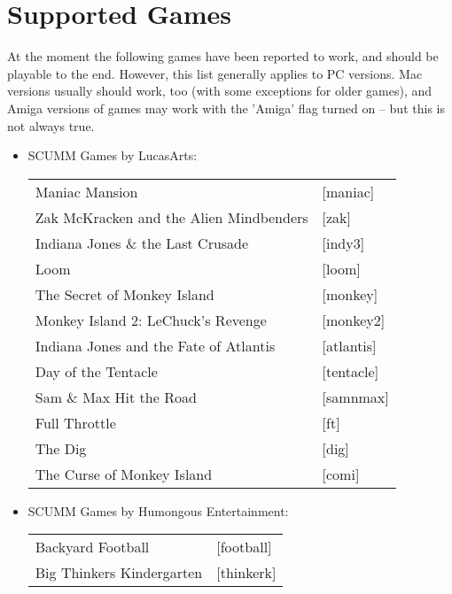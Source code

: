 


\section{Supported Games}

At the moment the following games have been reported to work, and should
be playable to the end. However, this list generally applies to PC versions.
Mac versions usually should work, too (with some exceptions for older games),
and Amiga versions of games may work with the 'Amiga' flag turned on -- but
this is not always true.

\begin{itemize}
\item SCUMM Games by LucasArts:\\
  \begin {tabular} [h] {ll}
    Maniac Mansion&                                [maniac]\\
    Zak McKracken and the Alien Mindbenders&       [zak]\\
    Indiana Jones \& the Last Crusade&             [indy3]\\
    Loom&                                          [loom]\\
    The Secret of Monkey Island&                   [monkey]\\
    Monkey Island 2: LeChuck's Revenge&            [monkey2]\\
    Indiana Jones and the Fate of Atlantis&        [atlantis]\\
    Day of the Tentacle&                           [tentacle]\\
    Sam \& Max Hit the Road&                       [samnmax]\\
    Full Throttle&                                 [ft]\\
    The Dig&                                       [dig]\\
    The Curse of Monkey Island&                    [comi]\\
  \end{tabular}
\item SCUMM Games by Humongous Entertainment:\\
  \begin{tabular}[h]{ll}
    Backyard Football&                                             [football]\\
    Big Thinkers Kindergarten&                                     [thinkerk]\\

\end{tabular}
\end{itemize}
